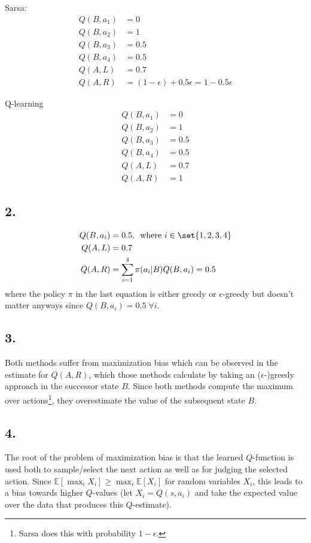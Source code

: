 \documentclass{article}
\begin{document}
Sarsa:
\begin{align*}
Q(B, a_1) &= 0\\
Q(B, a_2) &= 1\\
Q(B, a_3) &= 0.5\\
Q(B, a_4) &= 0.5\\
Q(A, L) &=  0.7\\
Q(A, R) &=  (1-\epsilon) + 0.5\epsilon = 1-0.5\epsilon
\end{align*}

Q-learning
\begin{align*}
Q(B, a_1) &= 0\\
Q(B, a_2) &= 1\\
Q(B, a_3) &= 0.5\\
Q(B, a_4) &= 0.5\\
Q(A, L) &=  0.7\\
Q(A, R) &=  1
\end{align*}



\subsection*{2.}
\begin{align*}
Q(B, a_i) &= 0.5 ,\, \text{ where  }i\in\set{1,2,3,4}\\
Q(A, L) &= 0.7\\
Q(A, R) &= \sum_{i=1}^4 \pi(a_i|B) Q(B,a_i) = 0.5
\end{align*}
where the policy \(\pi\) in the last equation is either greedy or \(\epsilon\)-greedy but doesn't matter
anyways since \(Q(B, a_i) = 0.5\; \forall i\).

\subsection*{3.}
Both methods suffer from maximization bias which can be observed in the estimate for $Q(A,R)$, which those methods calculate by taking an ($\epsilon$-)greedy approach in the successor state $B$. Since both methods compute the maximum over actions\footnote{Sarsa does this with probability $1-\epsilon$.}, they overestimate the value of the subsequent state $B$.


\subsection*{4.}
The root of the problem of maximization bias is that the learned $Q$-function is used both to sample/select the next action as well as for judging the selected action. Since \(\mathbb{E}[\max_i X_i] \geq \max_i \mathbb{E}[X_i]\) for random variables \(X_i\), this leads to a bias towards higher \(Q\)-values (let \(X_i = Q(s, a_i)\) and take the expected value over the data that produces this \(Q\)-estimate).
\end{document}
